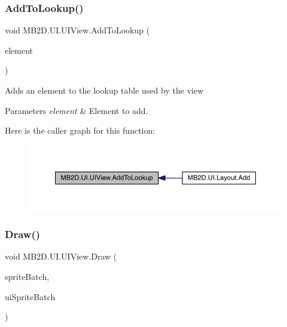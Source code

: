 \subsubsection{\texorpdfstring{Add\+To\+Lookup()}{AddToLookup()}}
{\footnotesize\ttfamily void M\+B2\+D.\+U\+I.\+U\+I\+View.\+Add\+To\+Lookup (\begin{DoxyParamCaption}\item[{\hyperlink{class_m_b2_d_1_1_u_i_1_1_u_i_element}{U\+I\+Element}}]{element }\end{DoxyParamCaption})\hspace{0.3cm}{\ttfamily [inline]}}



Adds an element to the lookup table used by the view 


\begin{DoxyParams}{Parameters}
{\em element} & Element to add.\\
\hline
\end{DoxyParams}
Here is the caller graph for this function\+:\nopagebreak
\begin{figure}[H]
\begin{center}
\leavevmode
\includegraphics[width=350pt]{class_m_b2_d_1_1_u_i_1_1_u_i_view_aad1fdbf0c8a8d94cb57fff8b5ff43ec8_icgraph}
\end{center}
\end{figure}
\hypertarget{class_m_b2_d_1_1_u_i_1_1_u_i_view_a1f1acf013f17aa0738ff2d9b0516126e}{}\label{class_m_b2_d_1_1_u_i_1_1_u_i_view_a1f1acf013f17aa0738ff2d9b0516126e} 
\subsubsection{\texorpdfstring{Draw()}{Draw()}}
{\footnotesize\ttfamily void M\+B2\+D.\+U\+I.\+U\+I\+View.\+Draw (\begin{DoxyParamCaption}\item[{Sprite\+Batch}]{sprite\+Batch,  }\item[{Sprite\+Batch}]{ui\+Sprite\+Batch }\end{DoxyParamCaption})\hspace{0.3cm}{\ttfamily [inline]}}



